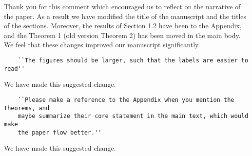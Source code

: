\documentclass{article}
\begin{document}
Thank you for this comment which encouraged us to reflect on the narrative of the
paper. As a result we have modified the title of the manuscript and the titles
of the sections. Moreover, the results of Section 1.2 have been to the Appendix,
and the Theorem 1 (old version Theorem 2) has been moved in the main body.
We feel that these changes improved our manuscript significantly.

\begin{verbatim}
    ``The figures should be larger, such that the labels are easier to read''
\end{verbatim}

We have made this suggested change.

\begin{verbatim}
    ``Please make a reference to the Appendix when you mention the Theorems, and
    maybe summarize their core statement in the main text, which would make
    the paper flow better.''
\end{verbatim}

We have made this suggested change.
\end{document}
